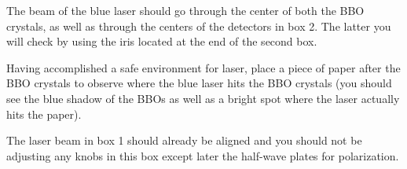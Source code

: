 \documentclass{../lab}
\begin{document}
The beam of the blue laser should go through the center of both the BBO crystals, as well as through the centers of the detectors in box 2. The latter you will check by using the iris located at the end of the second box.

Having accomplished a safe environment for laser, place a piece of paper after the BBO crystals to observe where the blue laser hits the BBO crystals (you should see the blue shadow of the BBOs as well as a bright spot where the laser actually hits the paper). 

The laser beam in box 1 should already be aligned and you should not be adjusting any knobs in this box except later the half-wave plates for polarization.


\end{document}
